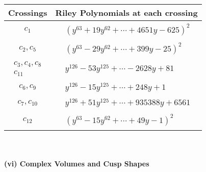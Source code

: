 \documentclass[1p]{elsarticle_modified}
\theoremstyle{definition}
\begin{document}
\begin{tabular}{m{50pt}|m{274pt}}
Crossings & \hspace{64pt}Riley Polynomials at each crossing \\
\hline $$\begin{aligned}c_{1}\end{aligned}$$&$\begin{aligned}
&(y^{63}+19 y^{62}+\cdots+4651 y-625)^{2}
\end{aligned}$\\
\hline $$\begin{aligned}c_{2},c_{5}\end{aligned}$$&$\begin{aligned}
&(y^{63}-29 y^{62}+\cdots+399 y-25)^{2}
\end{aligned}$\\
\hline $$\begin{aligned}c_{3},c_{4},c_{8}\\c_{11}\end{aligned}$$&$\begin{aligned}
&y^{126}-53 y^{125}+\cdots-2628 y+81
\end{aligned}$\\
\hline $$\begin{aligned}c_{6},c_{9}\end{aligned}$$&$\begin{aligned}
&y^{126}-15 y^{125}+\cdots+248 y+1
\end{aligned}$\\
\hline $$\begin{aligned}c_{7},c_{10}\end{aligned}$$&$\begin{aligned}
&y^{126}+51 y^{125}+\cdots+935388 y+6561
\end{aligned}$\\
\hline $$\begin{aligned}c_{12}\end{aligned}$$&$\begin{aligned}
&(y^{63}-15 y^{62}+\cdots+49 y-1)^{2}
\end{aligned}$\\
\hline
\end{tabular}\\~\\
\newpage\flushleft \textbf{(vi) Complex Volumes and Cusp Shapes}
\end{document}
